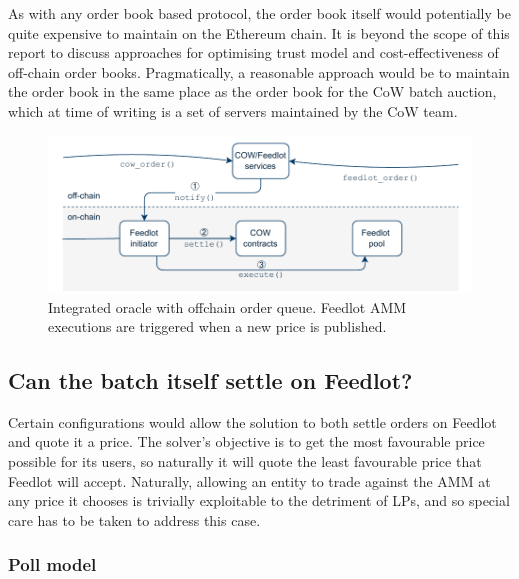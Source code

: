 \documentclass[a4paper,10pt]{article}
\theoremstyle{remark}
\begin{document}
As with any order book based protocol, the order book itself would potentially be quite expensive to maintain on the Ethereum chain.
%
It is beyond the scope of this report to discuss approaches for optimising trust model and cost-effectiveness of off-chain order books.
%
Pragmatically, a reasonable approach would be to maintain the order book in the same place as the order book for the CoW batch auction, which at time of writing is a set of servers maintained by the CoW team.
\begin{figure}
  \begin{center}
    \includegraphics{diagrams/sub-merged.pdf}
    \caption{Integrated oracle with offchain order queue. Feedlot AMM executions are triggered when a new price is published.}
  \end{center}
\end{figure}

\subsection{Can the batch itself settle on Feedlot?}
\label{solution-on-feedlot}

Certain configurations would allow the solution to both settle orders on Feedlot and quote it a price.
%
The solver's objective is to get the most favourable price possible for its users, so naturally it will quote the least favourable price that Feedlot will accept.
%
Naturally, allowing an entity to trade against the AMM at any price it chooses is trivially exploitable to the detriment of LPs, and so special care has to be taken to address this case.


\subsubsection{Poll model}
\end{document}
